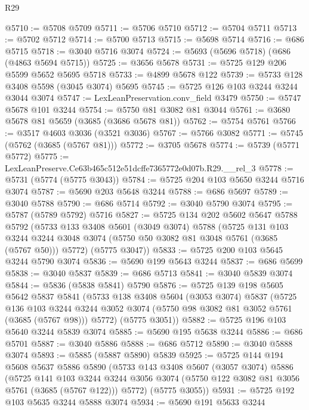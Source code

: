 \begin{lexlean}{R29}
\begin{coremodule}
@5710 := @5708 @5709
@5711 := @5706 @5710
@5712 := @5704 @5711
@5713 := @5702 @5712
@5714 := @5700 @5713
@5715 := @5698 @5714
@5716 := @686 @5715
@5718 := @3040 @5716 @3074
@5724 := @5693 (@5696 @5718) (@686 (@4863 @5694 @5715))
@5725 := @3656 @5678
@5731 := @5725 @129 @206 @5599 @5652 @5695 @5718
@5733 := @4899 @5678 @122
@5739 := @5733 @128 @3408 @5598 (@3045 @3074) @5695
@5745 := @5725 @126 @103 @3244 @3244 @3044 @3074
@5747 := LexLeanPreservation.conv_field @3479
@5750 := @5747 @5678 @101 @3244
@5754 := @5750 @81 @3082 @81 @3044
@5761 := @3680 @5678 @81 @5659 (@3685 (@3686 @5678 @81))
@5762 := @5754 @5761
@5766 := @3517 @4603 @3036 (@3521 @3036)
@5767 := @5766 @3082
@5771 := @5745 (@5762 (@3685 (@5767 @81)))
@5772 := @3705 @5678
@5774 := @5739 (@5771 @5772)
@5775 := LexLeanPreserve.Ce63b465c512e51dcffe7365772e0d07b.R29.__rel_3
@5778 := @5731 (@5774 (@5775 @3043))
@5784 := @5725 @204 @103 @5650 @3244 @5716 @3074
@5787 := @5690 @203 @5648 @3244
@5788 := @686 @5697
@5789 := @3040 @5788
@5790 := @686 @5714
@5792 := @3040 @5790 @3074
@5795 := @5787 (@5789 @5792) @5716
@5827 := @5725
    @134
    @202
    @5602
    @5647
    @5788
    @5792
    (@5733
      @133
      @3408
      @5601
      (@3049 @3074)
      @5788
      (@5725
        @131
        @103
        @3244
        @3244
        @3048
        @3074
        (@5750 @50 @3082 @81 @3048 @5761 (@3685 (@5767 @50)))
        @5772)
      (@5775 @3047))
@5833 := @5725 @200 @103 @5645 @3244 @5790 @3074
@5836 := @5690 @199 @5643 @3244
@5837 := @686 @5699
@5838 := @3040 @5837
@5839 := @686 @5713
@5841 := @3040 @5839 @3074
@5844 := @5836 (@5838 @5841) @5790
@5876 := @5725
    @139
    @198
    @5605
    @5642
    @5837
    @5841
    (@5733
      @138
      @3408
      @5604
      (@3053 @3074)
      @5837
      (@5725
        @136
        @103
        @3244
        @3244
        @3052
        @3074
        (@5750 @98 @3082 @81 @3052 @5761 (@3685 (@5767 @98)))
        @5772)
      (@5775 @3051))
@5882 := @5725 @196 @103 @5640 @3244 @5839 @3074
@5885 := @5690 @195 @5638 @3244
@5886 := @686 @5701
@5887 := @3040 @5886
@5888 := @686 @5712
@5890 := @3040 @5888 @3074
@5893 := @5885 (@5887 @5890) @5839
@5925 := @5725
    @144
    @194
    @5608
    @5637
    @5886
    @5890
    (@5733
      @143
      @3408
      @5607
      (@3057 @3074)
      @5886
      (@5725
        @141
        @103
        @3244
        @3244
        @3056
        @3074
        (@5750 @122 @3082 @81 @3056 @5761 (@3685 (@5767 @122)))
        @5772)
      (@5775 @3055))
@5931 := @5725 @192 @103 @5635 @3244 @5888 @3074
@5934 := @5690 @191 @5633 @3244

\end{coremodule}
\end{lexlean}

